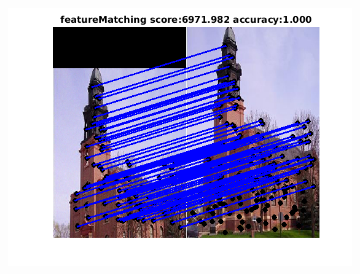 \documentclass[
	fontsize=12pt,
	paper=a4,
	twoside=false,
	numbers=noenddot,
	plainheadsepline,
	toc=listof,
	toc=bibliography
]{scrartcl}
\begin{document}
\begin{figure}[h]
\begin{subfigure}[b]{0.3\textwidth}
		\includegraphics[scale=0.4]{"fig_ver2608/RealImages/Img_trafo/no_descr/using_cdf_afftrafo/fi_2_featM"} 
	\end{subfigure} 	


\end{figure}
\end{document}
